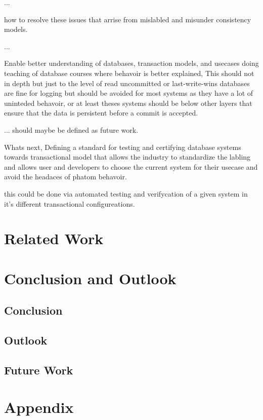 \documentclass[a4paper,10pt,titlepage]{report}
\begin{document}
...

how to resolve these issues that arrise from mislabled and misunder consistency models.

...

Enable better understanding of databases, transaction models, and usecases doing teaching of database courses where behavoir is better explained, This should not in depth but just to the level of read uncommitted or last-write-wins databases are fine for logging but should be avoided for most systems as they have a lot of uninteded behavoir, or at least theses systems should be below other layers that ensure that the data is persistent before a commit is accepted.

... should maybe be defined as future work.

Whats next, Defining a standard for testing and certifying database systems towards transactional model that allows the industry to standardize the labling and allows user and developers to choose the current system for their usecase and avoid the headaces of phatom behavoir.

this could be done via automated testing and verifycation of a given system in it's different transactional configureations.




\chapter{Related Work}

\chapter{Conclusion and Outlook}
\section*{Conclusion}

\section*{Outlook}


\section{Future Work}
   




\newpage
\chapter{Appendix}
\end{document}
